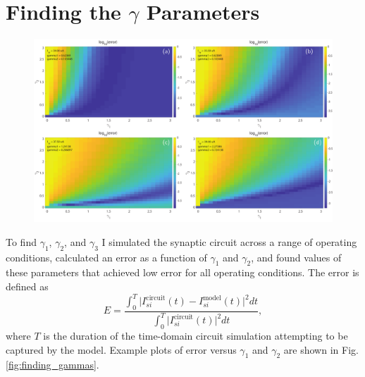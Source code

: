 \documentclass[]{article}
\begin{document}
\section{\label{apx:finding_gammas}Finding the $\gamma$ Parameters}
\begin{figure}[h!]
\centering
\includegraphics[width=17.2cm]{_finding_gammas.pdf}
\end{figure}
To find $\gamma_1$, $\gamma_2$, and $\gamma_3$ I simulated the synaptic circuit across a range of operating conditions, calculated an error as a function of $\gamma_1$ and $\gamma_2$, and found values of these parameters that achieved low error for all operating conditions. The error is defined as
\begin{equation}
\label{eq:finding_gammas__error}
E = \frac{\int_0^T\big|I_{si}^{\mathrm{circuit}}(t)-I_{si}^{\mathrm{model}}(t)\big|^2dt}{\int_0^T\big|I_{si}^{\mathrm{circuit}}(t)\big|^2dt},
\end{equation}
where $T$ is the duration of the time-domain circuit simulation attempting to be captured by the model. Example plots of error versus $\gamma_1$ and $\gamma_2$ are shown in Fig.\,\ref{fig:finding_gammas}.
\end{document}
